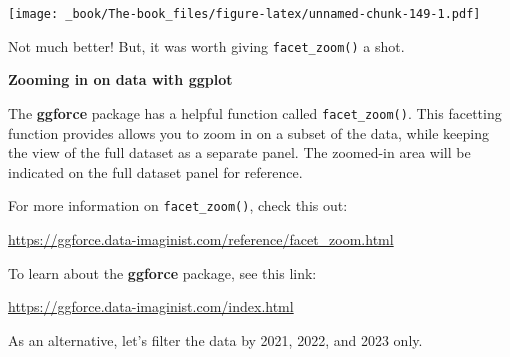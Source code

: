 \documentclass[
]{book}
\begin{document}
\texttt{[image: \_book/The-book\_files/figure-latex/unnamed-chunk-149-1.pdf]}

Not much better! But, it was worth giving \texttt{facet\_zoom()} a shot.

\begin{blackbox}

\begin{center}
\textbf{Zooming in on data with ggplot}

\end{center}

The \textbf{ggforce} package has a helpful function called \texttt{facet\_zoom()}. This facetting function provides allows you to zoom in on a subset of the data, while keeping the view of the full dataset as a separate panel. The zoomed-in area will be indicated on the full dataset panel for reference.

For more information on \texttt{facet\_zoom()}, check this out:

\url{https://ggforce.data-imaginist.com/reference/facet_zoom.html}

To learn about the \textbf{ggforce} package, see this link:

\url{https://ggforce.data-imaginist.com/index.html}

\end{blackbox}

As an alternative, let's filter the data by 2021, 2022, and 2023 only.
\end{document}
